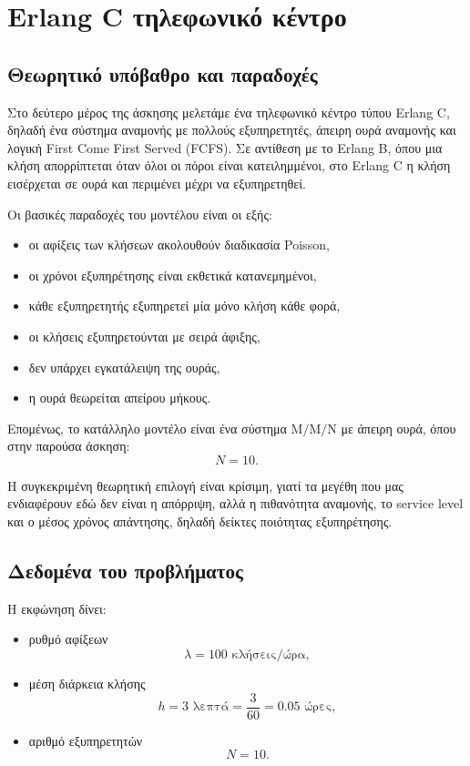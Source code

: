 \documentclass{article}
\begin{document}
\newpage
\section{Erlang C τηλεφωνικό κέντρο}

\subsection{Θεωρητικό υπόβαθρο και παραδοχές}

Στο δεύτερο μέρος της άσκησης μελετάμε ένα τηλεφωνικό κέντρο τύπου Erlang C, δηλαδή ένα σύστημα αναμονής με πολλούς εξυπηρετητές, άπειρη ουρά αναμονής και λογική \foreignlanguage{english}{First Come First Served (FCFS)}. Σε αντίθεση με το Erlang B, όπου μια κλήση απορρίπτεται όταν όλοι οι πόροι είναι κατειλημμένοι, στο Erlang C η κλήση εισέρχεται σε ουρά και περιμένει μέχρι να εξυπηρετηθεί.

Οι βασικές παραδοχές του μοντέλου είναι οι εξής:
\begin{itemize}
    \item οι αφίξεις των κλήσεων ακολουθούν διαδικασία Poisson,
    \item οι χρόνοι εξυπηρέτησης είναι εκθετικά κατανεμημένοι,
    \item κάθε εξυπηρετητής εξυπηρετεί μία μόνο κλήση κάθε φορά,
    \item οι κλήσεις εξυπηρετούνται με σειρά άφιξης,
    \item δεν υπάρχει εγκατάλειψη της ουράς,
    \item η ουρά θεωρείται απείρου μήκους.
\end{itemize}

Επομένως, το κατάλληλο μοντέλο είναι ένα σύστημα $\mathrm{M/M/N}$ με άπειρη ουρά, όπου στην παρούσα άσκηση:
\[
N = 10.
\]

Η συγκεκριμένη θεωρητική επιλογή είναι κρίσιμη, γιατί τα μεγέθη που μας ενδιαφέρουν εδώ δεν είναι η απόρριψη, αλλά η πιθανότητα αναμονής, το service level και ο μέσος χρόνος απάντησης, δηλαδή δείκτες ποιότητας εξυπηρέτησης.

\subsection{Δεδομένα του προβλήματος}

Η εκφώνηση δίνει:
\begin{itemize}
    \item ρυθμό αφίξεων
    \[
    \lambda = 100 \text{ κλήσεις/ώρα},
    \]
    \item μέση διάρκεια κλήσης
    \[
    h = 3 \text{ λεπτά} = \frac{3}{60} = 0.05 \text{ ώρες},
    \]
    \item αριθμό εξυπηρετητών
    \[
    N = 10.
    \]
\end{itemize}
\end{document}
